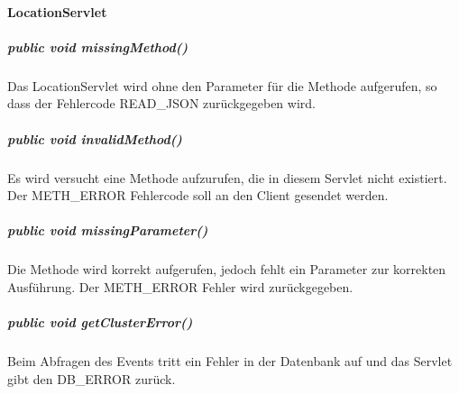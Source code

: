 \documentclass{scrartcl}
\begin{document}
\paragraph{LocationServlet}
\subparagraph{public void missingMethod()}
Das LocationServlet wird ohne den Parameter für die Methode aufgerufen, so dass der Fehlercode READ\_JSON zurückgegeben wird.
\subparagraph{public void invalidMethod()}
Es wird versucht eine Methode aufzurufen, die in diesem Servlet nicht existiert. Der METH\_ERROR Fehlercode soll an den Client gesendet werden.
\subparagraph{public void missingParameter()}
Die Methode wird korrekt aufgerufen, jedoch fehlt ein Parameter zur korrekten Ausführung. Der METH\_ERROR Fehler wird zurückgegeben.
\subparagraph{public void getClusterError()}
Beim Abfragen des Events tritt ein Fehler in der Datenbank auf und das Servlet gibt den DB\_ERROR zurück.
\newpage
\end{document}
